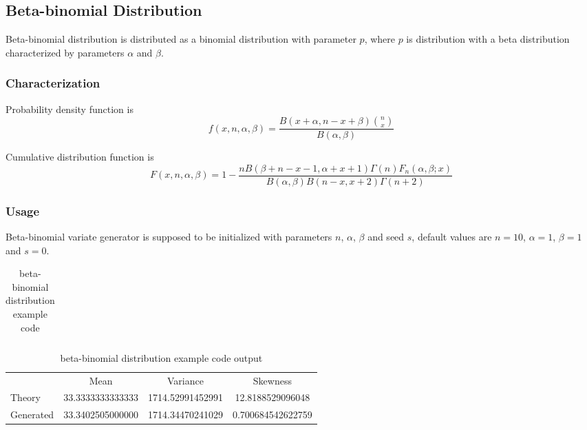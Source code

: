 \subsection{Beta-binomial Distribution} \label{beta-binomialdistribution}

Beta-binomial distribution is distributed as a binomial distribution with parameter $p$, where $p$ is distribution with a beta distribution characterized by parameters $\alpha$ and $\beta$.
\subsubsection{Characterization}

Probability density function is
\begin{equation}
    f(x,n,\alpha,\beta) = \frac{B(x+\alpha,n-x+\beta)\binom{n}{x}}{B(\alpha, \beta)} 
\end{equation}

Cumulative distribution function is
\begin{equation}
    F(x,n,\alpha,\beta)=1-\frac{n B(\beta+n-x-1,\alpha+x+1)\Gamma(n)F_n(\alpha,\beta;x)}{B(\alpha,\beta)B(n-x,x+2)\Gamma(n+2)}
\end{equation}


\subsubsection{Usage}

Beta-binomial variate generator is supposed to be initialized with parameters $n$, $\alpha$, $\beta$ and seed $s$, default values are $n=10$, $\alpha = 1$, $\beta = 1$ and $s = 0$.

\begin{tiny}
\begin{ttfamily}
\begin{center}
\begin{longtable}{|l|}
\caption{beta-binomial distribution example code} \\
\hline 

\hline
\end{longtable}
\end{center}
\end{ttfamily}
\end{tiny}


\begin{center}
\begin{longtable}{|l | c c c|}
\caption{beta-binomial distribution example code output} \\
\hline 
           &       Mean                  & Variance             & Skewness \\
Theory     &      33.3333333333333      & 1714.52991452991    & 12.8188529096048  \\
Generated  &      33.3402505000000      & 1714.34470241029    & 0.700684542622759  \\
\hline
\end{longtable}
\end{center}


